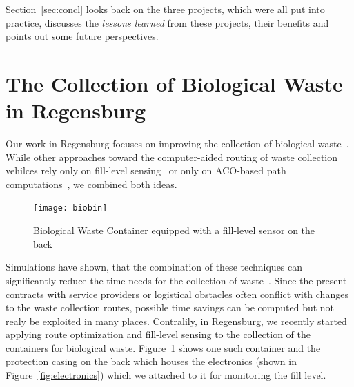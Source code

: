 \documentclass[10pt]{article}
\begin{document}
Section~\ref{sec:concl} looks back on the three projects, which were all 
put into practice, discusses the {\it lessons learned} from these projects,
their benefits and points out some future perspectives.


\section{The Collection of Biological Waste in Regensburg}
\label{sec:Regensburg}

Our work in Regensburg focuses on improving the collection of biological waste~\cite{Burger18}.
While other approaches toward the computer-aided routing of waste collection vehilces 
rely only on fill-level sensing~\cite{LundinOS17} or only on ACO-based path 
computations~\cite{ismail09}, we combined both ideas. 

\begin{figure}[h!]
    \centering
  \texttt{[image: biobin]}
  \caption{Biological Waste Container equipped with a fill-level sensor on the back}
  \label{fig:container}       %
\end{figure}

Simulations have shown, that 
the combination of these techniques can significantly reduce the time needs for the collection
of waste~\cite{Sharmin16}. Since the present contracts with service providers or logistical
obstacles often conflict with changes to the waste collection routes, possible time savings can be 
computed but not realy be exploited in many places.
Contralily, in Regensburg, we recently started applying route optimization and fill-level 
sensing to the collection of the containers for biological waste.
Figure~\ref{fig:container} shows one such container and the protection casing on the
back which houses the electronics (shown in Figure~\ref{fig:electronics}) which we attached 
to it for monitoring the fill level.
\end{document}
